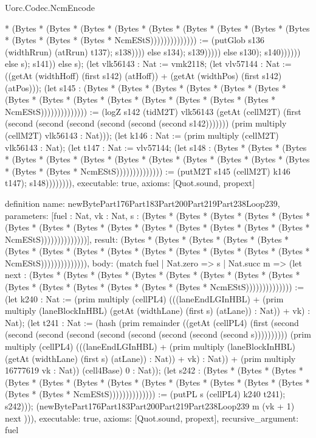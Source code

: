 \begin{lexlean}{Uorc.Codec.NcmEncode}
\begin{semanticmodule}
{* (Bytes * (Bytes * (Bytes * (Bytes * (Bytes * (Bytes * (Bytes * (Bytes * (Bytes * (Bytes * (Bytes * (Bytes * NcmEStS)))))))))))))) := (putGlob s136 (widthRrun) (atRrun) t137); s138)))) else s134); s139))))) else s130); s140)))))) else s); s141)) else s); (let vlk56143 : Nat := vmk2118; (let vlv57144 : Nat := ((getAt (widthHoff) (first s142) (atHoff)) + (getAt (widthPos) (first s142) (atPos))); (let s145 : (Bytes * (Bytes * (Bytes * (Bytes * (Bytes * (Bytes * (Bytes * (Bytes * (Bytes * (Bytes * (Bytes * (Bytes * (Bytes * (Bytes * NcmEStS)))))))))))))) := (logZ s142 (tidM2T) vlk56143 (getAt (cellM2T) (first (second (second (second (second (second (second s142))))))) (prim multiply (cellM2T) vlk56143 : Nat))); (let k146 : Nat := (prim multiply (cellM2T) vlk56143 : Nat); (let t147 : Nat := vlv57144; (let s148 : (Bytes * (Bytes * (Bytes * (Bytes * (Bytes * (Bytes * (Bytes * (Bytes * (Bytes * (Bytes * (Bytes * (Bytes * (Bytes * (Bytes * NcmEStS)))))))))))))) := (putM2T s145 (cellM2T) k146 t147); s148)))))))),
  executable: true,
  axioms: [Quot.sound, propext]
}

definition{
  name: newBytePart176Part183Part200Part219Part238Loop239,
  parameters: [fuel : Nat, vk : Nat, s : (Bytes * (Bytes * (Bytes * (Bytes * (Bytes * (Bytes * (Bytes * (Bytes * (Bytes * (Bytes * (Bytes * (Bytes * (Bytes * (Bytes * NcmEStS))))))))))))))],
  result: (Bytes * (Bytes * (Bytes * (Bytes * (Bytes * (Bytes * (Bytes * (Bytes * (Bytes * (Bytes * (Bytes * (Bytes * (Bytes * (Bytes * NcmEStS)))))))))))))),
  body: (match fuel
    | Nat.zero => s
    | Nat.succ m => (let next : (Bytes * (Bytes * (Bytes * (Bytes * (Bytes * (Bytes * (Bytes * (Bytes * (Bytes * (Bytes * (Bytes * (Bytes * (Bytes * (Bytes * NcmEStS)))))))))))))) := (let k240 : Nat := (prim multiply (cellPL4) (((laneEndLGInHBL) + (prim multiply (laneBlockInHBL) (getAt (widthLane) (first s) (atLane)) : Nat)) + vk) : Nat); (let t241 : Nat := (hash (prim remainder ((getAt (cellPL4) (first (second (second (second (second (second (second (second (second (second s)))))))))) (prim multiply (cellPL4) (((laneEndLGInHBL) + (prim multiply (laneBlockInHBL) (getAt (widthLane) (first s) (atLane)) : Nat)) + vk) : Nat)) + (prim multiply 16777619 vk : Nat)) (cell4Base) 0 : Nat)); (let s242 : (Bytes * (Bytes * (Bytes * (Bytes * (Bytes * (Bytes * (Bytes * (Bytes * (Bytes * (Bytes * (Bytes * (Bytes * (Bytes * (Bytes * NcmEStS)))))))))))))) := (putPL s (cellPL4) k240 t241); s242))); (newBytePart176Part183Part200Part219Part238Loop239 m (vk + 1) next ))),
  executable: true,
  axioms: [Quot.sound, propext],
  recursive_argument: fuel
}


\end{semanticmodule}
\end{lexlean}
